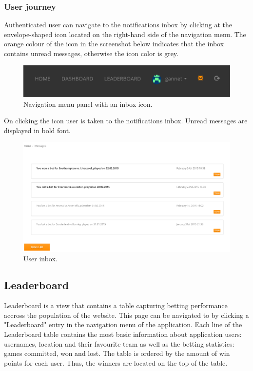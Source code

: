 \subsubsection*{User journey}
\label{subsec:notificationsuserjourney}
Authenticated user can navigate to the notifications inbox by clicking at the envelope-shaped icon located on the right-hand side of the navigation menu. The orange colour of the icon in the screenshot below indicates that the inbox contains unread messages, otherwise the icon color is grey.

\begin{figure}[H]
	\begin{center}
		\includegraphics[width=.90\textwidth]{impl/images/navigationMenu}
		\caption{Navigation menu panel with an inbox icon.} \label{fig:using: navigationmenu}
	\end{center}
\end{figure}

On clicking the icon user is taken to the notifications inbox. Unread messages are displayed in bold font.

\begin{figure}[H]
	\begin{center}
		\includegraphics[width=.90\textwidth]{impl/images/inbox}
		\caption{User inbox.} \label{fig:using: inbox}
	\end{center}
\end{figure}

\subsection{Leaderboard}
\label{subsec:leaderboard}
Leaderboard is a view that contains a table capturing betting performance accross the population of the website. This page can be navigated to by clicking a "Leaderboard" entry in the navigation menu of the application. Each line of the Leaderboard table contains the most basic information about application users: usernames, location and their favourite team as well as the betting statistics: games committed, won and lost. The table is ordered by the amount of win points for each user. Thus, the winners are located on the top of the table. 

